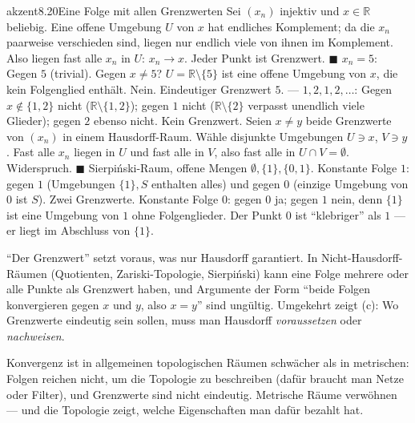 \begin{loesungkarte}{akzent}{8.20}{Eine Folge mit allen Grenzwerten}
Sei $(x_n)$ injektiv und $x\in\mathbb R$ beliebig. Eine offene Umgebung $U$ von $x$ hat endliches Komplement; da die $x_n$ paarweise verschieden sind, liegen nur endlich viele von ihnen im Komplement. Also liegen fast alle $x_n$ in $U$: $x_n\to x$. Jeder Punkt ist Grenzwert. $\blacksquare$
$x_n = 5$: Gegen $5$ (trivial). Gegen $x\neq5$? $U = \mathbb R\setminus\{5\}$ ist eine offene Umgebung von $x$, die kein Folgenglied enthält. Nein. Eindeutiger Grenzwert $5$. --- $1, 2, 1, 2, \dots$: Gegen $x\notin\{1, 2\}$ nicht ($\mathbb R\setminus\{1, 2\}$); gegen $1$ nicht ($\mathbb R\setminus\{2\}$ verpasst unendlich viele Glieder); gegen $2$ ebenso nicht. Kein Grenzwert.
Seien $x\neq y$ beide Grenzwerte von $(x_n)$ in einem Hausdorff-Raum. Wähle disjunkte Umgebungen $U\ni x$, $V\ni y$. Fast alle $x_n$ liegen in $U$ und fast alle in $V$, also fast alle in $U\cap V = \emptyset$. Widerspruch. $\blacksquare$
Sierpiński-Raum, offene Mengen $\emptyset, \{1\}, \{0, 1\}$. Konstante Folge $1$: gegen $1$ (Umgebungen $\{1\}, S$ enthalten alles) und gegen $0$ (einzige Umgebung von $0$ ist $S$). Zwei Grenzwerte. Konstante Folge $0$: gegen $0$ ja; gegen $1$ nein, denn $\{1\}$ ist eine Umgebung von $1$ ohne Folgenglieder. Der Punkt $0$ ist \enquote{klebriger} als $1$ --- er liegt im Abschluss von $\{1\}$.
\begin{fehler}\kastentext
\enquote{Der Grenzwert} setzt voraus, was nur Hausdorff garantiert. In Nicht-Hausdorff-Räumen (Quotienten, Zariski-Topologie, Sierpiński) kann eine Folge mehrere oder alle Punkte als Grenzwert haben, und Argumente der Form \enquote{beide Folgen konvergieren gegen $x$ und $y$, also $x = y$} sind ungültig. Umgekehrt zeigt (c): Wo Grenzwerte eindeutig sein sollen, muss man Hausdorff \emph{voraussetzen} oder \emph{nachweisen}.
\end{fehler}
\begin{mitnehmen}\kastentext
Konvergenz ist in allgemeinen topologischen Räumen schwächer als in metrischen: Folgen reichen nicht, um die Topologie zu beschreiben (dafür braucht man Netze oder Filter), und Grenzwerte sind nicht eindeutig. Metrische Räume verwöhnen --- und die Topologie zeigt, welche Eigenschaften man dafür bezahlt hat.
\end{mitnehmen}
\end{loesungkarte}

